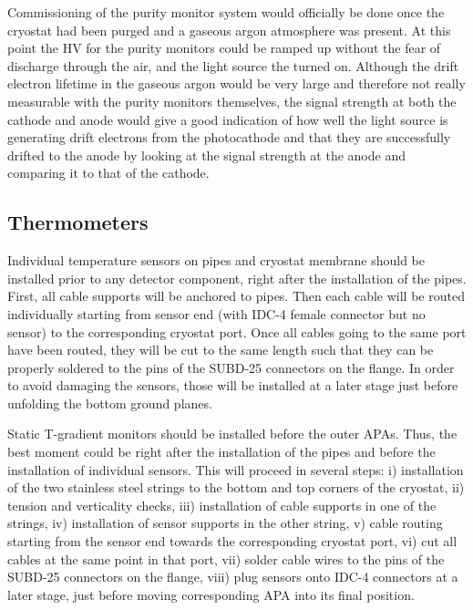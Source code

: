 Commissioning of the purity monitor system would officially be done once the cryostat had been purged and a gaseous argon atmosphere was present.  At this point the HV for the purity monitors could be ramped up without the fear of discharge through the air, and the light source the turned on.  Although the drift electron lifetime in the gaseous argon would be very large and therefore not really measurable with the purity monitors themselves, the signal strength at both the cathode and anode would give a good indication of how well the light source is generating drift electrons from the photocathode and that they are successfully drifted to the anode by looking at the signal strength at the anode and comparing it to that of the cathode.


\subsection{Thermometers}
\label{sec:fdgen-slow-cryo-instal-th}


Individual temperature sensors on pipes and cryostat membrane should be installed prior to any detector component, right after the installation of the pipes.
First, all cable supports will be anchored to pipes. Then each cable will be routed individually starting from sensor end (with IDC-4 female connector but no sensor)
to the corresponding cryostat port. Once all cables going to the same port have been routed, they will be cut to the same length such that they can be properly soldered
to the pins of the SUBD-25 connectors on the flange. In order to avoid damaging the sensors, those will be installed at a later stage just before unfolding the bottom ground planes.

Static T-gradient monitors should be installed before the outer APAs. Thus, the best moment could be right after the installation of the pipes
and before the installation of individual sensors. This will proceed in several steps: i) installation of the two stainless steel strings to the bottom and top corners of the cryostat,
ii) tension and verticality checks, iii) installation of cable supports in one of the strings, iv) installation of sensor supports in the other string, v) cable routing starting from
the sensor end towards the corresponding cryostat port, vi) cut all cables at the same point in that port, vii) solder cable wires to the pins of the SUBD-25 connectors on the flange,
viii) plug sensors onto IDC-4 connectors at a later stage, just before moving corresponding APA into its final position. 

